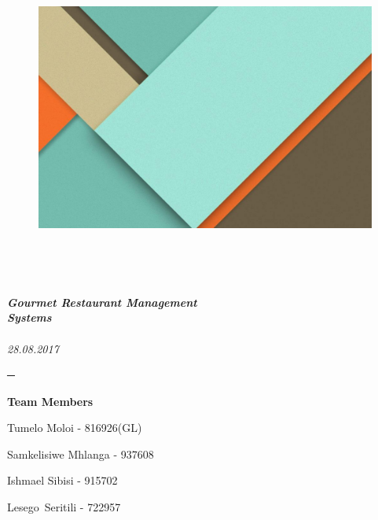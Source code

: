 \documentclass[a4paper,12pt]{report}
\begin{document}
\sloppy
\subsection*{ }
 \par
\noindent 




\begin{figure}[H]
\begin{center}
\includegraphics[width=6.46in,height=4.31in]{./uploads_new/Lab_2.docx_DIR/media/image8.jpg}
\end{center}
\end{figure}




\vspace{12pt}
\noindent 
\appendix
\textit{\textbf{\Huge Gourmet Restaurant Management\\ Systems}} \\ \\
\textit{ \emph{28.08.2017}}
 \par
\noindent 
 \par
\noindent 
{\fontsize{18pt}{18pt}\selectfont \textbf{─} \\} \par
\noindent 
\newpage
{\fontsize{16pt}{16pt}\selectfont \textbf{Team Members} \\} \par
\noindent 
{\fontsize{14pt}{14pt}\selectfont Tumelo Moloi - 816926(GL) \\} \par
\noindent 
{\fontsize{14pt}{14pt}\selectfont Samkelisiwe Mhlanga - 937608  \\} \par
\noindent 
{\fontsize{14pt}{14pt}\selectfont Ishmael Sibisi - 915702 \\} \par
\noindent 
{\fontsize{14pt}{14pt}\selectfont Lesego~Seritili - 722957   \\} \par
\noindent 
\end{document}
